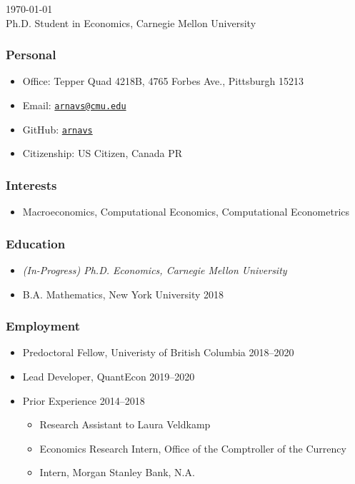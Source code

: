 \documentclass[12pt]{article}   %
\begin{document}
\renewcommand{\labelitemi}{~}

 \hfill \monthyeardate\today \\
\flushleft Ph.D. Student in Economics, Carnegie Mellon University

\subsubsection*{Personal}
\begin{itemize}
  \item Office: Tepper Quad 4218B, 4765 Forbes Ave., Pittsburgh 15213
  \item Email: \href{mailto:arnavs@cmu.edu}{\texttt{arnavs@cmu.edu}}
  \item GitHub: \href{https://github.com/arnavs}{\texttt{arnavs}}
  \item Citizenship: US Citizen, Canada PR
\end{itemize}

\subsubsection*{Interests}
\begin{itemize}
  \item Macroeconomics, Computational Economics, Computational Econometrics
\end{itemize} 

\subsubsection*{Education}
\begin{itemize}
  \item \textit{(In-Progress) Ph.D. Economics, Carnegie Mellon University} 
  \item B.A. Mathematics, New York University \hfill 2018
\end{itemize} 

\subsubsection*{Employment}
\begin{itemize}
  \item Predoctoral Fellow, Univeristy of British Columbia \hfill 2018--2020
  \item Lead Developer, QuantEcon \hfill 2019--2020
  \item Prior Experience \hfill 2014--2018 
  \begin{itemize}\setlength{\leftskip}{1cm}
    \item Research Assistant to Laura Veldkamp
    \item Economics Research Intern, Office of the Comptroller of the Currency
    \item Intern, Morgan Stanley Bank, N.A.
  \end{itemize}
\end{itemize}
\end{document}
